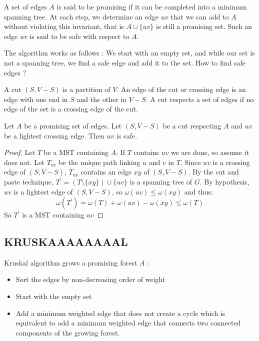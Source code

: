 \documentclass[12pt]{cours}
\begin{document}
\begin{definition}
    A set of edges $A$ is said to be promising if it can be completed into a minimum spanning tree. At each step, we determine an edge $uv$ that we can add to $A$ without violating this invariant, that is $A \cup \{uv\}$ is still a promising set.
    Such an edge $uv$ is said to be safe with respect to $A$.
\end{definition}

The algorithm works as follows : We start with an empty set, and while our set is not a spanning tree, we find a safe edge and add it to the set.
How to find safe edges ?

\begin{definition}
    A cut $\left(S, V - S\right)$ is a partition of $V$. An edge of the cut or crossing edge is an edge with one end in $S$ and the other in $V - S$. A cut respects a set of edges if no edge of the set is a crossing edge of the cut.
\end{definition}

\begin{proposition}
    Let $A$ be a promising set of edges. Let $\left(S, V - S\right)$ be a cut respecting $A$ and $uv$ be a lightest crossing edge. Then $uv$ is safe.
\end{proposition}
\begin{proof}
    Let $T$ be a MST containing $A$. If $T$ contains $uv$ we are done, so assume it does not. Let $T_{uv}$ be the unique path linking $u$ and $v$ in $T$. Since $uv$ is a crossing edge of $(S, V - S)$, $T_{uv}$ contains an edge $xy$ of $(S, V - S)$. By the cut and paste technique, $T^{'} = (T \setminus \{xy\} ) \cup \{uv\}$ is a spanning tree of $G$. By hypothesis, $uv$ is a lightest edge of $(S, V - S)$, so $\omega(uv) \leq \omega(xy)$ and thus: \[\omega(T^{'}) = \omega(T) + \omega(uv) - \omega(xy) \leq \omega(T)\]
    So $T^{'}$ is a MST containing $uv$
\end{proof}

\subsection{KRUSKAAAAAAAAL}
Kruskal algorithm grows a promising forest $A$ :
\begin{itemize}
    \item Sort the edges by non-decreasing order of weight
    \item Start with the empty set
    \item Add a minimum weighted edge that does not create a cycle which is equivalent to add a minimum weighted edge that connects two connected components of the growing forest.
\end{itemize}
\end{document}
